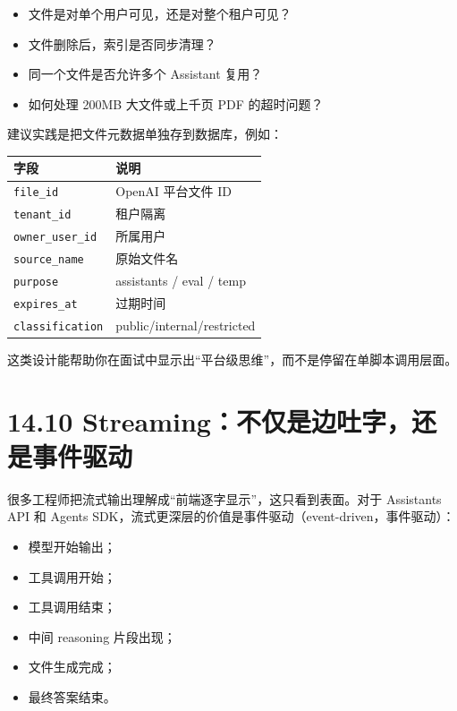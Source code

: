 \begin{itemize}[leftmargin=2em]
\item 文件是对单个用户可见，还是对整个租户可见？
\item 文件删除后，索引是否同步清理？
\item 同一个文件是否允许多个 Assistant 复用？
\item 如何处理 200MB 大文件或上千页 PDF 的超时问题？
\end{itemize}

建议实践是把文件元数据单独存到数据库，例如：


\begingroup
\scriptsize
\setlength{\tabcolsep}{3pt}
\begin{longtable}{|p{}|p{}|}
\hline
字段 & 说明 \\ \hline
\texttt{file\_id} & OpenAI 平台文件 ID \\ \hline
\texttt{tenant\_id} & 租户隔离 \\ \hline
\texttt{owner\_user\_id} & 所属用户 \\ \hline
\texttt{source\_name} & 原始文件名 \\ \hline
\texttt{purpose} & assistants / eval / temp \\ \hline
\texttt{expires\_at} & 过期时间 \\ \hline
\texttt{classification} & public/internal/restricted \\ \hline
\end{longtable}
\endgroup

这类设计能帮助你在面试中显示出``平台级思维''，而不是停留在单脚本调用层面。


\section{14.10 Streaming：不仅是边吐字，还是事件驱动}

很多工程师把流式输出理解成``前端逐字显示''，这只看到表面。对于 Assistants API 和 Agents SDK，流式更深层的价值是事件驱动（event-driven，事件驱动）：


\begin{itemize}[leftmargin=2em]
\item 模型开始输出；
\item 工具调用开始；
\item 工具调用结束；
\item 中间 reasoning 片段出现；
\item 文件生成完成；
\item 最终答案结束。
\end{itemize}

